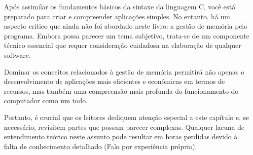 Após assimilar os fundamentos básicos da sintaxe da linguagem C, você está 
preparado para criar e compreender aplicações simples. No entanto, há um aspecto 
crítico que ainda não foi abordado neste livro: a gestão de memória pelo 
programa. Embora possa parecer um tema subjetivo, trata-se de um componente 
técnico essencial que requer consideração cuidadosa na elaboração de qualquer 
software.

Dominar os conceitos relacionados à gestão de memória permitirá não apenas o 
desenvolvimento de aplicações mais eficientes e econômicas em termos de recursos, 
mas também uma compreensão mais profunda do funcionamento do computador como um todo.

Portanto, é crucial que os leitores dediquem atenção especial a este capítulo e, se 
necessário, revisitem partes que possam parecer complexas. Qualquer lacuna de 
entendimento teórico neste assunto pode resultar em horas perdidas devido à falta 
de conhecimento detalhado (Falo por experiência própria).
